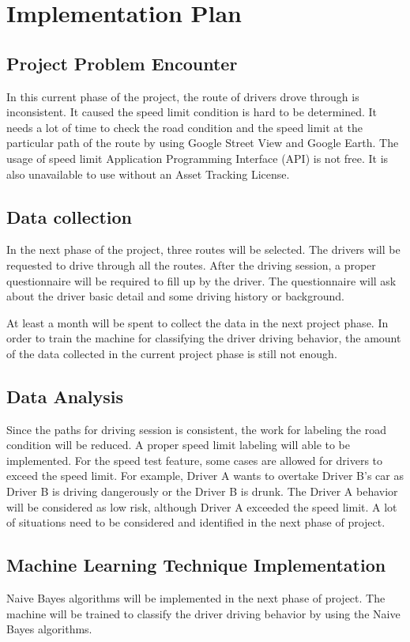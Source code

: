 \chapter{Implementation Plan}
\section{Project Problem Encounter}
In this current phase of the project, the route of drivers drove through is inconsistent. It caused the speed limit condition is hard to be determined. It needs a lot of time to check the road condition and the speed limit at the particular path of the route by using Google Street View and Google Earth. The usage of speed limit Application Programming Interface (API) is not free. It is also unavailable to use without an Asset Tracking License.

\section{Data collection}
In the next phase of the project, three routes will be selected. The drivers will be requested to drive through all the routes. After the driving session, a proper questionnaire will be required to fill up by the driver. The questionnaire will ask about the driver basic detail and some driving history or background.

At least a month will be spent to collect the data in the next project phase. In order to train the machine for classifying the driver driving behavior, the amount of the data collected in the current project phase is still not enough.

\section{Data Analysis}
Since the paths for driving session is consistent, the work for labeling the road condition will be reduced. A proper speed limit labeling will able to be implemented. For the speed test feature, some cases are allowed for drivers to exceed the speed limit. For example, Driver A wants to overtake Driver B's car as Driver B is driving dangerously or the Driver B is drunk. The Driver A behavior will be considered as low risk, although Driver A exceeded the speed limit. A lot of situations need to be considered and identified in the next phase of project.

\section{Machine Learning Technique Implementation}
Naive Bayes algorithms will be implemented in the next phase of project. The machine will be trained to classify the driver driving behavior by using the Naive Bayes algorithms. 

